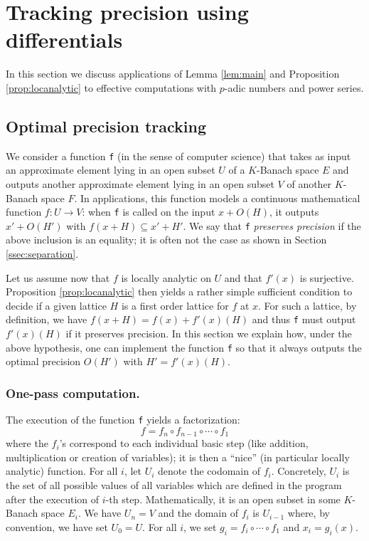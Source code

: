 \documentclass{lms}
\begin{document}
\section{Tracking precision using differentials}
\label{sec:tracking}

In this section we discuss applications of Lemma \ref{lem:main} and Proposition \ref{prop:locanalytic}
to effective computations with $p$-adic numbers and power series.

\subsection{Optimal precision tracking}

We consider a function {\tt f} (in the sense of computer 
science) that takes as input an approximate element lying in an open 
subset $U$ of a $K$-Banach space $E$ and outputs another approximate
element lying in an open subset $V$ of another $K$-Banach space $F$.
In applications, this function models a continuous
mathematical function $f : U \to V$: when 
{\tt f} is called on the input $x + O(H)$, it outputs $x' + O(H')$ with 
$f(x+H) \subseteq x' + H'$. We say that {\tt f} \emph{preserves precision}
if the above inclusion is an equality; it is 
often not the case as shown in Section \ref{ssec:separation}.

Let us assume now that $f$ is locally analytic on $U$ and
that $f'(x)$ is surjective. Proposition \ref{prop:locanalytic} then 
yields a rather simple sufficient condition to decide if a given lattice 
$H$ is a first order lattice for $f$ at $x$. For such a lattice, by 
definition, we have $f(x+H) = f(x) + f'(x)(H)$ and thus {\tt f}
must output $f'(x)(H)$ if it preserves precision. In this section we
explain how, under the above hypothesis, one can implement the function 
{\tt f} so that it always outputs the optimal precision $O(H')$ with $H' 
= f'(x)(H)$.

\subsubsection*{One-pass computation.}

The execution of the function {\tt f} yields a factorization:
$$f = f_n \circ f_{n-1} \circ \cdots \circ f_1$$
where the $f_i$'s correspond to each individual basic step (like 
addition, multiplication or creation of variables); it is then a
``nice'' (in particular locally analytic) function. For all 
$i$, let $U_i$ denote the codomain of $f_i$. Concretely, $U_i$ is the 
set of all possible values of all variables which are defined in the 
program after the execution of $i$-th step. Mathematically, it is an 
open subset in some $K$-Banach space $E_i$. We have $U_n = V$ and the 
domain of $f_i$ is $U_{i-1}$ where, by convention, we have set $U_0 = 
U$.
For all $i$, we set $g_i = f_i \circ \cdots \circ f_1$ and $x_i = 
g_i(x)$. 
\end{document}
